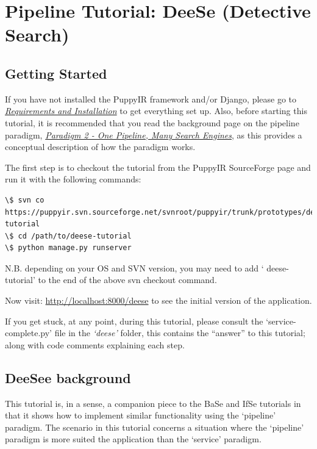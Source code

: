 \documentclass[letterpaper,10pt,english]{sphinxmanual}
\begin{document}
\section{Pipeline Tutorial: DeeSe (Detective Search)}
\label{pipeline-tutorial:pipeline-puppyir-tutorial}\label{pipeline-tutorial:pipeline-tutorial-deese-detective-search}\label{pipeline-tutorial::doc}

\subsection{Getting Started}
\label{pipeline-tutorial:getting-started}
If you have not installed the PuppyIR framework and/or Django, please go to {\hyperref[installation:requirements-and-installation]{\emph{Requirements and Installation}}} to get everything set up. Also, before starting this tutorial, it is recommended that you read the background page on the pipeline paradigm, {\hyperref[pipeline:pipeline-architecture]{\emph{Paradigm 2 - One Pipeline, Many Search Engines}}}, as this provides a conceptual description of how the paradigm works.

The first step is to checkout the tutorial from the PuppyIR SourceForge page and run it with the following commands:

\begin{Verbatim}[commandchars=\\\{\}]
\$ svn co https://puppyir.svn.sourceforge.net/svnroot/puppyir/trunk/prototypes/deese-tutorial
\$ cd /path/to/deese-tutorial
\$ python manage.py runserver
\end{Verbatim}

N.B. depending on your OS and SVN version, you may need to add ` deese-tutorial' to the end of the above svn checkout command.

Now visit: \href{http://localhost:8000/deese}{http://localhost:8000/deese} to see the initial version of the application.

If you get stuck, at any point, during this tutorial, please consult the `service-complete.py' file in the \emph{`deese'} folder, this contains the ``answer'' to this tutorial; along with code comments explaining each step.


\subsection{DeeSee background}
\label{pipeline-tutorial:deesee-background}
This tutorial is, in a sense, a companion piece to the BaSe and IfSe tutorials in that it shows how to implement similar functionality using the `pipeline' paradigm. The scenario in this tutorial  concerns a situation where the `pipeline' paradigm is more suited the application than the `service' paradigm.
\end{document}

